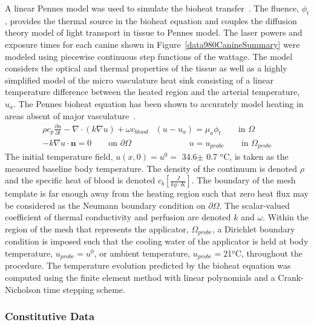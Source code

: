 \documentclass{article}
\begin{document}
A linear Pennes model was used to simulate the bioheat
transfer~\cite{Pennes48}.  The fluence, $\phi_t$, provides the
thermal source in the bioheat equation and couples the diffusion
theory model of light transport in tissue to Pennes model.  The
laser powers and exposure times for each canine shown in
Figure~\ref{data980CanineSummary} were modeled using piecewise
continuous step functions of the wattage.  The model considers the
optical and thermal properties of the tissue as well as a highly
simplified model of the micro vasculature heat sink consisting of a
linear temperature difference between the heated region and the
arterial temperature, $u_a$. The Pennes bioheat equation has been
shown to accurately model heating in areas absent of major
vasculature~\cite{arkin1994}. 
\[ \begin{split}
 \rho  c_p \frac{\partial u}{\partial t}
 -\nabla \cdot ( {k} \nabla u) 
 +{\omega} c_{blood} &(u - u_a )
 = {\mu_a} \phi_t  \qquad \text{in } \Omega
\\
   -  k  \nabla u \cdot \textbf{n} = 0
           \qquad \text{on } \partial \Omega
  &\qquad \qquad 
   u  = u_{probe} \qquad \text{in } \Omega_{probe}
\end{split} 
\]
The initial temperature field, $u( x,0)=u^0=$ 34.6$\pm$ 0.7 $^o$C,
is taken as the measured baseline body temperature.  The density of
the continuum is denoted $\rho$ and the specific heat of blood is
denoted $c_{b} \left[\frac{J}{kg \cdot K}\right]$.  The boundary of
the mesh template is far enough away from the heating region such
that zero heat flux may be considered as the Neumann boundary
condition on $\partial \Omega$.  The scalar-valued coefficient of
thermal conductivity and perfusion are denoted $k$ and $\omega$.
Within the region of the mesh that represents the applicator,
$\Omega_{probe}$, a Dirichlet boundary condition is imposed such
that the cooling water of the applicator is held at body
temperature, $u_{probe}=u^0$, or ambient temperature,
$u_{probe}=$21$^o$C, throughout the procedure.  The temperature
evolution predicted by the bioheat equation was computed using the
finite element method with linear polynomials and a Crank-Nicholson
time stepping scheme.

\subsubsection{Constitutive Data}
\end{document}
